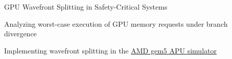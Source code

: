 

\begin{cvprojects}

  \cvproject
    {GPU Wavefront Splitting in Safety-Critical Systems} %
    {
      \begin{cvitems} %
        \item {Analyzing worst-case execution of GPU memory requests under branch divergence}
        \item {Implementing wavefront splitting in the \href{http://www.m5sim.org/wiki/images/1/19/AMD_gem5_APU_simulator_isca_2018_gem5_wiki.pdf}{AMD gem5 APU simulator}}
      \end{cvitems}
    }

\end{cvprojects}
